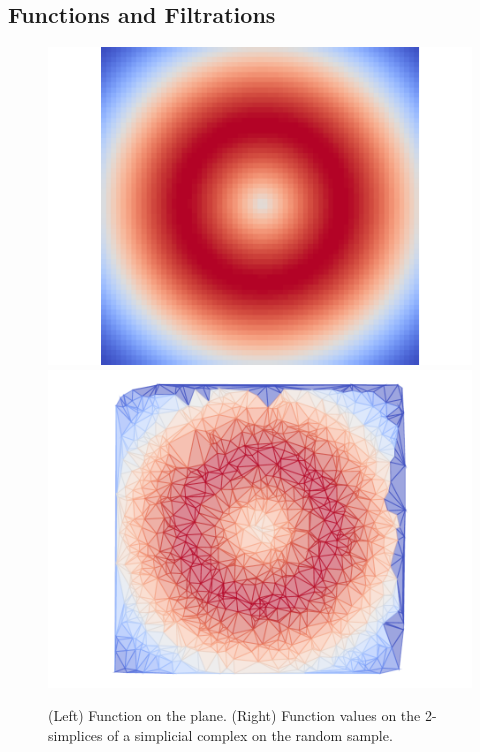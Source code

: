 \begin{figure}[htbp]
\centering
    \caption{}
    \label{fig:balloons2}
\end{figure}

\subsection{Functions and Filtrations}

\begin{figure}[htbp]
\centering
    \includegraphics[scale=0.5]{figures/fgrid.pdf}\hspace{-0.5in}
    \includegraphics[scale=0.5]{figures/fcomplex.pdf}
    \caption{(Left) Function on the plane.
            (Right) Function values on the 2-simplices of a simplicial complex on the random sample.}
    \label{fig:function}
\end{figure}

